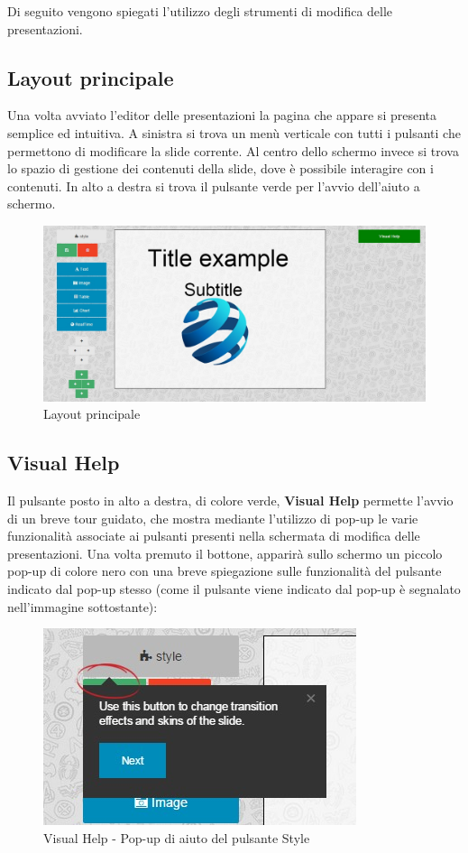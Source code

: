 Di seguito vengono spiegati l'utilizzo degli strumenti di modifica delle presentazioni.

\subsection{Layout principale}
Una volta avviato l'editor delle presentazioni la pagina che appare si presenta semplice ed intuitiva. A sinistra si trova un menù verticale con tutti i pulsanti che permettono di modificare la slide corrente. Al centro dello schermo invece si trova lo spazio di gestione dei contenuti della slide, dove è possibile interagire con i contenuti. In alto a destra si trova il pulsante verde per l'avvio dell'aiuto a schermo.

\begin{figure}[H] 
	\centering 
	\includegraphics[scale=0.40] {img/layout_editor}
	\caption{Layout principale} 
\end{figure}

\subsection{Visual Help}
Il pulsante posto in alto a destra, di colore verde, \textbf{Visual Help} permette l'avvio di un breve tour guidato, che mostra mediante l'utilizzo di pop-up le varie funzionalità associate ai pulsanti presenti nella schermata di modifica delle presentazioni. Una volta premuto il bottone, apparirà sullo schermo un piccolo pop-up di colore nero con una breve spiegazione sulle funzionalità del pulsante indicato dal pop-up stesso (come il pulsante viene indicato dal pop-up è segnalato nell'immagine sottostante):

\begin{figure}[H] 
	\centering 
	\includegraphics[scale=0.80] {img/tour}
	\caption{Visual Help - Pop-up di aiuto del pulsante Style} 
\end{figure}


